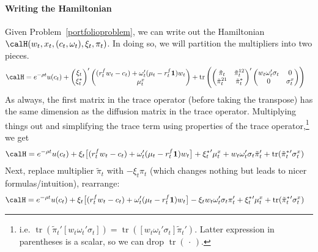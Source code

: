 \documentclass[12pt]{article}
\theoremstyle{plain}
\theoremstyle{definition}
\theoremstyle{remark}
\newcommand{\trace}{\operatorname{tr}}
\begin{document}
\paragraph{Writing the Hamiltonian}
Given Problem~\ref{portfolioproblem}, we can write out the Hamiltonian
$\calH(w_t,x_t,(c_t,\omega_t),\xi_t,\pi_t)$. In doing so, we will
partition the multipliers into two pieces.
\begin{align*}
  \calH
  &=
  e^{-\rho t}
  u(c_t)
  +
  \begin{pmatrix}
    \xi_t \\ \xi_t^*
  \end{pmatrix}'
  \begin{pmatrix}
    (r_t^fw_t-c_t)
    +
    \omega_{t}'
    (\mu_t - r^f_t\mathbf{1})w_t
    \\
    \mu_t^x
  \end{pmatrix}
  +
  \trace\left(
  \begin{pmatrix}
    \tilde{\pi}_t & \tilde{\pi}_t^{12}
    \\
    \tilde{\pi}_t^{21} & \tilde{\pi}_t^*
  \end{pmatrix}'
  \begin{pmatrix}
    w_t
    \omega_{t}'
    \sigma_t
    & 0
    \\
    0 & \sigma_t^x
  \end{pmatrix}
  \right)
\end{align*}
As always, the first matrix in the trace operator (before taking the
transpose) has the same dimension as the diffusion matrix in the trace
operator.
Multiplying things out and simplifying the trace term using properties
of the trace operator,\footnote{%
  i.e.
  $\trace\left( \tilde{\pi}_t' [ w_t\omega_t'\sigma_t ] \right)
  =\trace\left( [ w_t\omega_t'\sigma_t ] \tilde{\pi}_t' \right)$.
  Latter expression in parentheses is a scalar, so we can drop
  $\trace(\,\cdot\,)$.
}
we get
\begin{align*}
  \calH
  &=
  e^{-\rho t}
  u(c_t)
  +
  \xi_t\big[
    (r_t^fw_t-c_t)
    +
    \omega_{t}'
    (\mu_t - r^f_t\mathbf{1})w_t
  \big]
  +{\xi_t^*}'\mu_t^x
  + w_t \omega_{t}' \sigma_t\tilde{\pi}_t'
  +
  \trace(\tilde{\pi}_t^*{}'\sigma_t^x)
\end{align*}
Next, replace multiplier $\tilde{\pi}_t$ with $-\xi_t\pi_t$ (which
changes nothing but leads to nicer formulas/intuition), rearrange:
\begin{align*}
  \calH
  &=
  e^{-\rho t}
  u(c_t)
  +
  \xi_t
  \big[
  (r^f_tw_t -c_t)
  +
  \omega_{t}'
  (\mu_t - r^f_t\mathbf{1})w_t
  \big]
  -
  \xi_t w_t\omega_t'\sigma_t
  \pi_t'
  +
  \xi_t^*{}'\mu_t^x
  +
  \trace(\tilde{\pi}_t^*{}'\sigma_t^x)
\end{align*}
\end{document}
